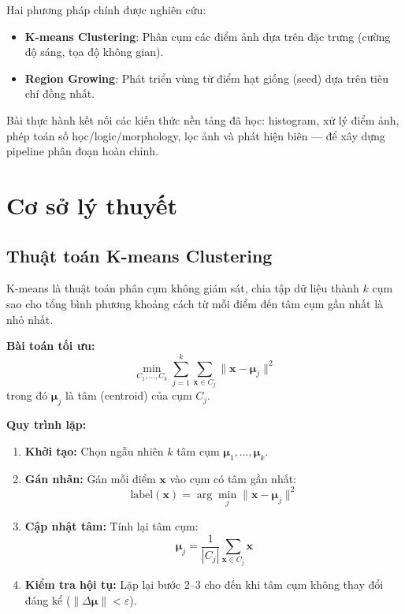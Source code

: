 \documentclass[12pt,a4paper]{article}
\begin{document}
Hai phương pháp chính được nghiên cứu:
\begin{itemize}
    \item \textbf{K-means Clustering}: Phân cụm các điểm ảnh dựa trên đặc trưng (cường độ sáng, tọa độ không gian).
    \item \textbf{Region Growing}: Phát triển vùng từ điểm hạt giống (seed) dựa trên tiêu chí đồng nhất.
\end{itemize}

Bài thực hành kết nối các kiến thức nền tảng đã học: histogram, xử lý điểm ảnh, phép toán số học/logic/morphology, lọc ảnh và phát hiện biên --- để xây dựng pipeline phân đoạn hoàn chỉnh.

\section{Cơ sở lý thuyết}

\subsection{Thuật toán K-means Clustering}

K-means là thuật toán phân cụm không giám sát, chia tập dữ liệu thành $k$ cụm sao cho tổng bình phương khoảng cách từ mỗi điểm đến tâm cụm gần nhất là nhỏ nhất.

\textbf{Bài toán tối ưu:}
\[
    \min_{C_1, \ldots, C_k} \sum_{j=1}^{k} \sum_{\mathbf{x} \in C_j} \lVert \mathbf{x} - \boldsymbol{\mu}_j \rVert^2
\]
trong đó $\boldsymbol{\mu}_j$ là tâm (centroid) của cụm $C_j$.

\textbf{Quy trình lặp:}
\begin{enumerate}
    \item \textbf{Khởi tạo:} Chọn ngẫu nhiên $k$ tâm cụm $\boldsymbol{\mu}_1, \ldots, \boldsymbol{\mu}_k$.
    \item \textbf{Gán nhãn:} Gán mỗi điểm $\mathbf{x}$ vào cụm có tâm gần nhất:
    \[
        \text{label}(\mathbf{x}) = \arg\min_j \lVert \mathbf{x} - \boldsymbol{\mu}_j \rVert^2
    \]
    \item \textbf{Cập nhật tâm:} Tính lại tâm cụm:
    \[
        \boldsymbol{\mu}_j = \frac{1}{|C_j|} \sum_{\mathbf{x} \in C_j} \mathbf{x}
    \]
    \item \textbf{Kiểm tra hội tụ:} Lặp lại bước 2--3 cho đến khi tâm cụm không thay đổi đáng kể ($\lVert \Delta\boldsymbol{\mu}\rVert < \varepsilon$).
\end{enumerate}
\end{document}
